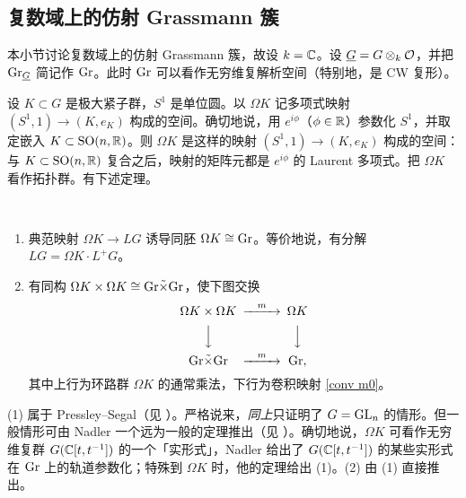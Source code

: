 
\subsection{复数域上的仿射 Grassmann 簇}\label{top loop group}

本小节讨论复数域上的仿射 Grassmann 簇，故设 $k={\mathbb C}$。设 $\underline G=G\otimes_k {\mathcal O}$，并把 ${\operatorname{Gr}}_{\underline G}$ 简记作 ${\operatorname{Gr}}$。此时 ${\operatorname{Gr}}$ 可以看作无穷维复解析空间（特别地，是 CW 复形）。

设 $K\subset G$ 是极大紧子群，$S^1$ 是单位圆。以 $\Omega K$ 记多项式映射 $(S^1,1)\to (K,e_K)$ 构成的空间。确切地说，用 $e^{i\phi}$（$\phi\in{\mathbb R}$）参数化 $S^1$，并取定嵌入 $K\subset \operatorname{SO}(n,{\mathbb R})$。则 $\Omega K$ 是这样的映射 $(S^1,1)\to (K,e_K)$ 构成的空间：与 $K\subset \operatorname{SO}(n,{\mathbb R})$ 复合之后，映射的矩阵元都是 $e^{i\phi}$ 的 Laurent 多项式。把 $\Omega K$ 看作拓扑群。有下述定理。

\begin{thm}\label{top triv}~
\begin{enumerate}
\item 典范映射 $\Omega K\to LG$ 诱导同胚 $\Omega K\cong {\operatorname{Gr}}$。等价地说，有分解 $LG=\Omega K\cdot L^+G$。

\item 有同构 $\Omega K\times\Omega K\cong {\operatorname{Gr}}\tilde\times{\operatorname{Gr}}$，使下图交换
\[\begin{CD}
\Omega K\times \Omega K@>m>>\Omega K\\
@VVV@VVV\\
\Gr\tilde\times\Gr @>m>>\Gr,
\end{CD}\]
其中上行为环路群 $\Omega K$ 的通常乘法，下行为卷积映射 \eqref{conv m0}。
\end{enumerate}
\end{thm}

(1) 属于 Pressley--Segal（见 \cite[\S\ 8.3]{PS}）。严格说来，\emph{同上}只证明了 $G={\operatorname{GL}}_n$ 的情形。但一般情形可由 Nadler 一个远为一般的定理推出（见 \cite[\S\ 4]{Na}）。确切地说，$\Omega K$ 可看作无穷维复群 $G({\mathbb C}[t,t^{-1}])$ 的一个「实形式」，Nadler 给出了 $G({\mathbb C}[t,t^{-1}])$ 的某些实形式在 ${\operatorname{Gr}}$ 上的轨道参数化；特殊到 $\Omega K$ 时，他的定理给出 (1)。(2) 由 (1) 直接推出。

